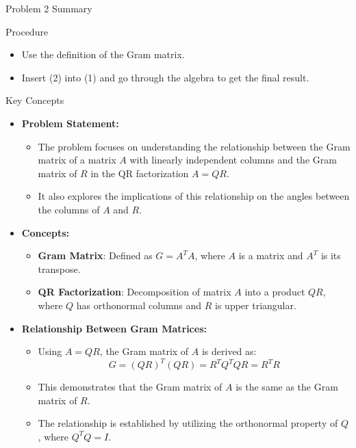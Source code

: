 \begin{summary}{Problem 2 Summary}
    \begin{statement}{Procedure}
        \begin{itemize}
            \item Use the definition of the Gram matrix.
            \item Insert (2) into (1) and go through the algebra to get the final result.
        \end{itemize}
    \end{statement}
    \begin{statement}{Key Concepts}
        \begin{itemize}
            \item \textbf{Problem Statement:}
            \begin{itemize}
                \item The problem focuses on understanding the relationship between the Gram matrix of a matrix $A$ with linearly independent columns and the Gram matrix of $R$ in the QR factorization $A = QR$.
                \item It also explores the implications of this relationship on the angles between the columns of $A$ and $R$.
            \end{itemize}
            \item \textbf{Concepts:}
            \begin{itemize}
                \item \textbf{Gram Matrix}: Defined as $G = A^T A$, where $A$ is a matrix and $A^T$ is its transpose.
                \item \textbf{QR Factorization}: Decomposition of matrix $A$ into a product $QR$, where $Q$ has orthonormal columns and $R$ is upper triangular.
            \end{itemize}
            \item \textbf{Relationship Between Gram Matrices:}
            \begin{itemize}
                \item Using $A = QR$, the Gram matrix of $A$ is derived as:
                \[ G = (QR)^T (QR) = R^T Q^T QR = R^T R \]
                \item This demonstrates that the Gram matrix of $A$ is the same as the Gram matrix of $R$.
                \item The relationship is established by utilizing the orthonormal property of $Q$, where $Q^T Q = I$.
            \end{itemize}

\end{itemize}
\end{statement}
\end{summary}
